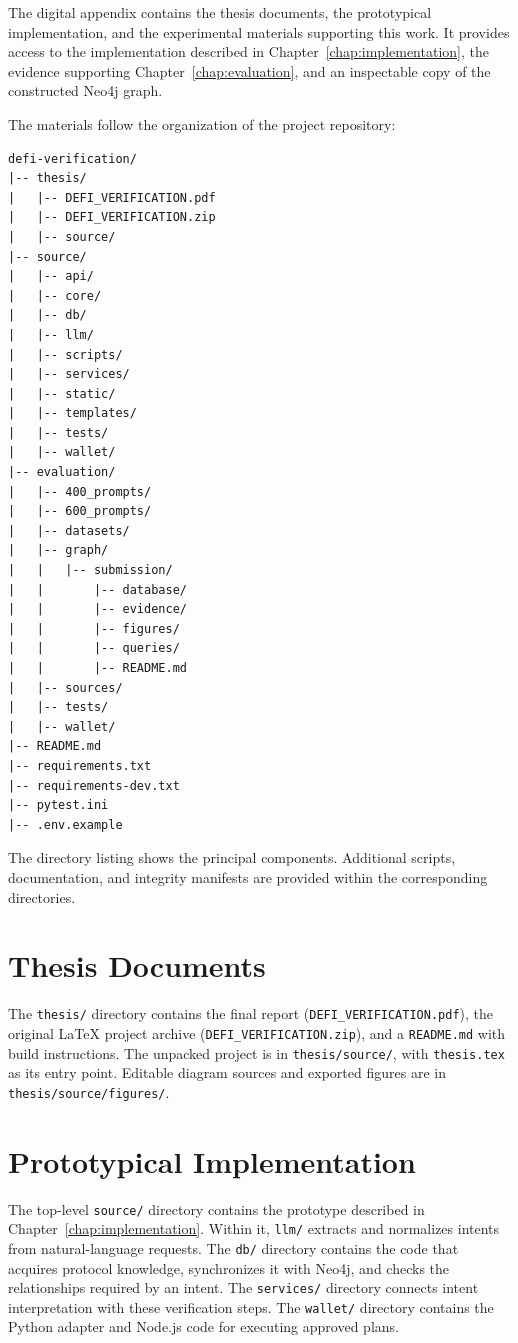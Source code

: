 

The digital appendix contains the thesis documents, the prototypical
implementation, and the experimental materials supporting this work.
It provides access to the implementation described in Chapter~\ref{chap:implementation},
the evidence supporting Chapter~\ref{chap:evaluation}, and an inspectable copy of the
constructed Neo4j graph.

The materials follow the organization of the project repository:

\begin{verbatim}
defi-verification/
|-- thesis/
|   |-- DEFI_VERIFICATION.pdf
|   |-- DEFI_VERIFICATION.zip
|   |-- source/
|-- source/
|   |-- api/
|   |-- core/
|   |-- db/
|   |-- llm/
|   |-- scripts/
|   |-- services/
|   |-- static/
|   |-- templates/
|   |-- tests/
|   |-- wallet/
|-- evaluation/
|   |-- 400_prompts/
|   |-- 600_prompts/
|   |-- datasets/
|   |-- graph/
|   |   |-- submission/
|   |       |-- database/
|   |       |-- evidence/
|   |       |-- figures/
|   |       |-- queries/
|   |       |-- README.md
|   |-- sources/
|   |-- tests/
|   |-- wallet/
|-- README.md
|-- requirements.txt
|-- requirements-dev.txt
|-- pytest.ini
|-- .env.example
\end{verbatim}

The directory listing shows the principal components. Additional
scripts, documentation, and integrity manifests are provided within
the corresponding directories.

\section{Thesis Documents}

The \texttt{thesis/} directory contains the final report
(\texttt{DEFI\_VERIFICATION.pdf}), the original LaTeX project archive
(\texttt{DEFI\_VERIFICATION.zip}), and a \texttt{README.md} with build
instructions. The unpacked project is in \texttt{thesis/source/},
with \texttt{thesis.tex} as its entry point. Editable diagram sources
and exported figures are in \texttt{thesis/source/figures/}.

\section{Prototypical Implementation}


The top-level \texttt{source/} directory contains the prototype
described in Chapter~\ref{chap:implementation}. Within it,
\texttt{llm/} extracts and normalizes intents from natural-language
requests. The \texttt{db/} directory contains the code that acquires
protocol knowledge, synchronizes it with Neo4j, and checks the
relationships required by an intent. The \texttt{services/} directory
connects intent interpretation with these verification steps.
The \texttt{wallet/} directory contains the Python adapter and Node.js
code for executing approved plans.

